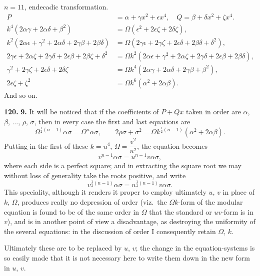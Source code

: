 \documentclass[11pt,a4paper]{article}
\theoremstyle{plain}
\begin{document}
$n = 11$, endecadic transformation.
\begin{align*}
P &= \alpha + \gamma x^2 + \epsilon x^4, \quad Q = \beta + \delta x^2 + \zeta x^4. \\
k^4(2\alpha\gamma + 2\alpha\delta + \beta^2) &= \Omega(\epsilon^2 + 2\epsilon\zeta + 2\delta\zeta), \\
k^2(2\alpha\epsilon + \gamma^2 + 2\alpha\delta + 2\gamma\beta + 2\beta\delta) &= \Omega(2\gamma\epsilon + 2\gamma\zeta + 2\epsilon\delta + 2\beta\delta + \delta^2), \\
2\gamma\epsilon + 2\alpha\zeta + 2\gamma\delta + 2\epsilon\beta + 2\beta\zeta + \delta^2 &= \Omega k^2(2\alpha\epsilon + \gamma^2 + 2\alpha\zeta + 2\gamma\delta + 2\epsilon\beta + 2\beta\delta), \\
\gamma^2 + 2\gamma\zeta + 2\epsilon\delta + 2\delta\zeta &= \Omega k^4(2\alpha\gamma + 2\alpha\delta + 2\gamma\beta + \beta^2), \\
2\epsilon\zeta + \zeta^2 &= \Omega k^6(\alpha^2 + 2\alpha\beta).
\end{align*}
And so on.


\noindent\textbf{120.} \textbf{9.} It will be noticed that if the coefficients of $P + Qx$ taken in order are $\alpha$, $\beta$, $\ldots$, $\rho$, $\sigma$, then in every case the first and last equations are
\[
\Omega^{\frac{1}{2}(n-1)}\alpha\sigma = \Omega^n\alpha\sigma, \qquad
2\rho\sigma + \sigma^2 = \Omega k^{\frac{1}{2}(n-1)}(\alpha^2 + 2\alpha\beta).
\]
Putting in the first of these $k = u^4$, $\Omega = \dfrac{v^2}{u^2}$, the equation becomes
\[
v^{n-1}\alpha\sigma = u^{n-1}v\alpha\sigma,
\]
where each side is a perfect square; and in extracting the square root we may without loss of generality take the roots positive, and write
\[
v^{\frac{1}{2}(n-1)}\alpha\sigma = u^{\frac{1}{2}(n-1)}v\alpha\sigma.
\]
This speciality, although it renders it proper to employ ultimately $u$, $v$ in place of $k$, $\Omega$, produces really no depression of order (viz.\ the $\Omega k$-form of the modular equation is found to be of the same order in $\Omega$ that the standard or $uv$-form is in $v$), and is in another point of view a disadvantage, as destroying the uniformity of the several equations: in the discussion of order I consequently retain $\Omega$, $k$.

Ultimately these are to be replaced by $u$, $v$; the change in the equation-systems is so easily made that it is not necessary here to write them down in the new form in $u$, $v$.
\end{document}
